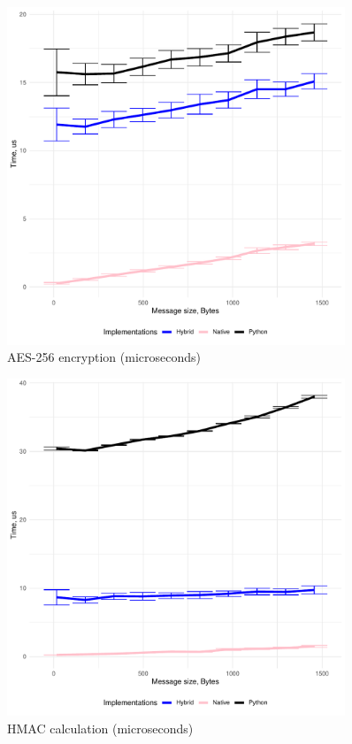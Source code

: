 \begin{figure}[h!]
    \centering
    \includegraphics[width=0.9\textwidth]{graphics/crypto/aes.pdf}
    \caption{AES-256 encryption (microseconds)}
    \label{fig:aes}
\end{figure}

\begin{figure}[h!]
    \centering
    \includegraphics[width=0.9\textwidth]{graphics/crypto/hmac.pdf}
    \caption{HMAC calculation (microseconds)}
    \label{fig:aes}
\end{figure}


